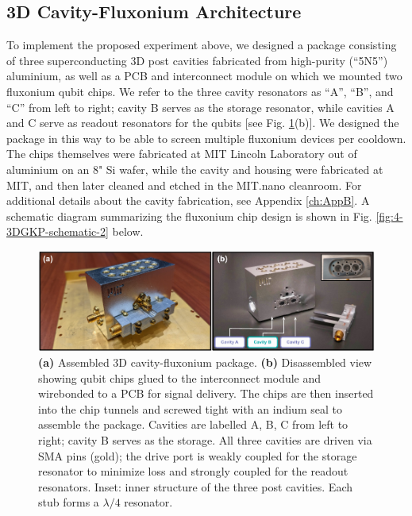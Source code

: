 \subsection{3D Cavity-Fluxonium Architecture \label{sec:4_3D_Cavity_Resonators}}
To implement the proposed experiment above, we designed a package consisting of three superconducting 3D post cavities fabricated from high-purity (``5N5'') aluminium, as well as a PCB and interconnect module on which we mounted two fluxonium qubit chips. We refer to the three cavity resonators as ``A'', ``B'', and ``C'' from left to right; cavity B serves as the storage resonator, while cavities A and C serve as readout resonators for the qubits [see Fig. \ref{fig:4-3DGKP-schematic-1}(b)]. We designed the package in this way to be able to screen multiple fluxonium devices per cooldown. The chips themselves were fabricated at MIT Lincoln Laboratory out of aluminium on an 8" Si wafer, while the cavity and housing were fabricated at MIT, and then later cleaned and etched in the MIT.nano cleanroom. For additional details about the cavity fabrication, see Appendix \ref{ch:AppB}. A schematic diagram summarizing the fluxonium chip design is shown in Fig. \ref{fig:4-3DGKP-schematic-2} below.

\begin{figure}[h]
    \centering
    \includegraphics[width=0.95\linewidth]{Figures/4/3DGKP-Schematic-1.pdf}
    \caption{\textbf{(a)} Assembled 3D cavity-fluxonium package. \textbf{(b)} Disassembled view showing qubit chips glued to the interconnect module and wirebonded to a PCB for signal delivery. The chips are then inserted into the chip tunnels and screwed tight with an indium seal to assemble the package. Cavities are labelled A, B, C from left to right; cavity B serves as the storage. All three cavities are driven via SMA pins (gold); the drive port is weakly coupled for the storage resonator to minimize loss and strongly coupled for the readout resonators. Inset: inner structure of the three post cavities. Each stub forms a $\lambda/4$ resonator.}
    \label{fig:4-3DGKP-schematic-1}
\end{figure}


